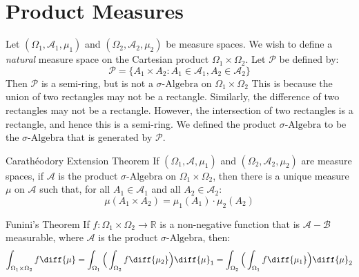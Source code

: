 \documentclass[crop=false,class=book,oneside]{standalone}
\begin{document}
    \section{Product Measures}
        Let $(\Omega_{1},\mathcal{A}_{1},\mu_{1})$ and
        $(\Omega_{2},\mathcal{A}_{2},\mu_{2})$ be measure spaces. We
        wish to define a \textit{natural} measure space on the Cartesian
        product $\Omega_{1}\times\Omega_{2}$. Let $\mathcal{P}$ be
        defined by:
        \begin{equation}
            \mathcal{P}=
            \{A_{1}\times{A}_{2}:
                A_{1}\in\mathcal{A}_{1},A_{2}\in\mathcal{A}_{2}\}
        \end{equation}
        Then $\mathcal{P}$ is a semi-ring, but is not a
        $\sigma\textrm{-Algebra}$ on $\Omega_{1}\times\Omega_{2}$ This is
        because the union of two rectangles may not be a rectangle.
        Similarly, the difference of two rectangles may not be a
        rectangle. However, the intersection of two rectangles is a
        rectangle, and hence this is a semi-ring. We defined the product
        $\sigma\textrm{-Algebra}$ to be the $\sigma\textrm{-Algebra}$ that
        is generated by $\mathcal{P}$. 
        \begin{ltheorem}{Carath\'{e}odory Extension Theorem}
            If $(\Omega_{1},\mathcal{A},\mu_{1})$ and
            $(\Omega_{2},\mathcal{A}_{2},\mu_{2})$ are measure spaces,
            if $\mathcal{A}$ is the product $\sigma\textrm{-Algebra}$ on
            $\Omega_{1}\times\Omega_{2}$, then there is a unique measure
            $\mu$ on $\mathcal{A}$ such that, for all
            $A_{1}\in\mathcal{A}_{1}$ and all $A_{2}\in\mathcal{A}_{2}$:
            \begin{equation}
                \mu(A_{1}\times{A}_{2})=\mu_{1}(A_{1})\cdot\mu_{2}(A_{2})
            \end{equation}
        \end{ltheorem}
        \begin{ltheorem}{Funini's Theorem}
            If $f:\Omega_{1}\times\Omega_{2}\rightarrow\mathbb{R}$
            is a non-negative function that is
            $\mathcal{A}-\mathcal{B}$ measurable, where $\mathcal{A}$ is
            the product $\sigma\textrm{-Algebra}$, then:
            \begin{equation}
                \int_{\Omega_{1}\times\Omega_{2}}f\diff{\mu}=
                \int_{\Omega_{1}}\Big(\int_{\Omega_{2}}f\diff{\mu_{2}}\Big)
                    \diff{\mu}_{1}
                =\int_{\Omega_{2}}
                    \Big(\int_{\Omega_{1}}f\diff{\mu_{1}}\Big)
                    \diff{\mu}_{2}
            \end{equation}
        \end{ltheorem}
\end{document}
